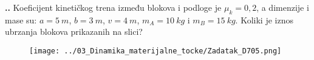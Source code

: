 
\noindent 
\textbf{
\thecjelina.\thezadatak.}
Koeficijent kinetičkog trena između blokova i podloge je $\mu_k=0,2$, a dimenzije i mase su: $a=5\ m$, $b=3\ m$, $v=4\ m$, $m_A=10\ kg$ i $m_B=15\ kg$.
Koliki je iznos ubrzanja blokova prikazanih na slici?
\begin{figure}[ht]%
  \begin{center}
    \texttt{[image: ../03\_Dinamika\_materijalne\_tocke/Zadatak\_D705.png]}
  \end{center}
\end{figure}


